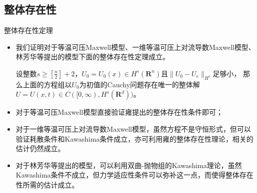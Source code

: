 \documentclass[mathserif]{beamer}
\begin{document}
\subsection{整体存在性}
\begin{frame}{整体存在性定理}
\begin{itemize}
	\item<2-> 我们证明对于等温可压Maxwell模型、一维等温可压上对流导数Maxwell模型、林芳华等提出的模型下面的整体存在性定理成立。
 \begin{theorem}[整体存在性定理] %
		设整数$s \ge [\frac{n}{2}]+2$，$U_0 = U_0(x) \in H^s(\mathbf{R}^n)$且$\|U_0 -U_e\|_{H^s}$足够小，
		那么上面的方程组以$U_0$为初值的Cauchy问题存在唯一的整体解$U=U(x,t) \in C([0,\infty),H^s(\mathbf{R}^d))$。
	\end{theorem}
\item<3-> 对于等温可压Maxwell模型直接验证雍提出的整体存在性条件即可；
\item<4-> 对于一维等温可压上对流导数Maxwell模型，虽然方程不是守恒形式，但可以验证耗散条件和Kawashima条件成立，亦可利用雍的整体存在性理论，相关的估计仍然成立。
\item<5-> 对于林芳华等提出的模型，可以利用双曲-抛物组的Kawashima理论，虽然Kawashima条件不成立，但力学适应性条件可以弥补这一点，而使得整体存在性所需的估计成立。
\end{itemize}
\end{frame}
\end{document}
